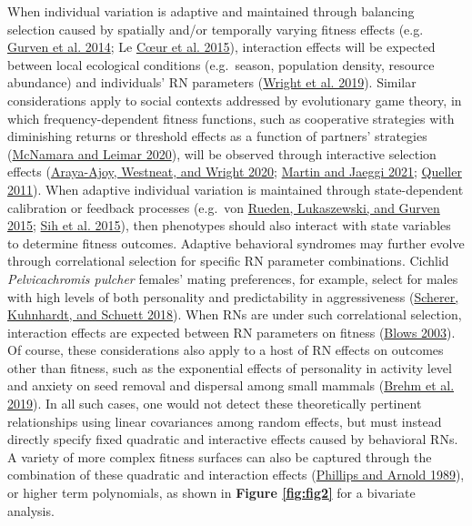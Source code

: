 \documentclass{article}
\begin{document}
When individual variation is adaptive and maintained through balancing
selection caused by spatially and/or temporally varying fitness effects
(e.g. \protect\hyperlink{ref-Gurven2014}{Gurven et al. 2014}; Le
\protect\hyperlink{ref-LC2015}{Cœur et al. 2015}), interaction effects
will be expected between local ecological conditions (e.g.~season,
population density, resource abundance) and individuals' RN parameters
(\protect\hyperlink{ref-Wright2019}{Wright et al. 2019}). Similar
considerations apply to social contexts addressed by evolutionary game
theory, in which frequency-dependent fitness functions, such as
cooperative strategies with diminishing returns or threshold effects as
a function of partners' strategies
(\protect\hyperlink{ref-McNamara2020}{McNamara and Leimar 2020}), will
be observed through interactive selection effects
(\protect\hyperlink{ref-Araya2020}{Araya-Ajoy, Westneat, and Wright
2020}; \protect\hyperlink{ref-Martin2021}{Martin and Jaeggi 2021};
\protect\hyperlink{ref-Queller2011}{Queller 2011}). When adaptive
individual variation is maintained through state-dependent calibration
or feedback processes (e.g.~von
\protect\hyperlink{ref-Rueden2015}{Rueden, Lukaszewski, and Gurven
2015}; \protect\hyperlink{ref-Sih2015}{Sih et al. 2015}), then
phenotypes should also interact with state variables to determine
fitness outcomes. Adaptive behavioral syndromes may further evolve
through correlational selection for specific RN parameter combinations.
Cichlid \emph{Pelvicachromis pulcher} females' mating preferences, for
example, select for males with high levels of both personality and
predictability in aggressiveness
(\protect\hyperlink{ref-Scherer2018}{Scherer, Kuhnhardt, and Schuett
2018}). When RNs are under such correlational selection, interaction
effects are expected between RN parameters on fitness
(\protect\hyperlink{ref-Blows2003}{Blows 2003}). Of course, these
considerations also apply to a host of RN effects on outcomes other than
fitness, such as the exponential effects of personality in activity
level and anxiety on seed removal and dispersal among small mammals
(\protect\hyperlink{ref-Brehm2019}{Brehm et al. 2019}). In all such
cases, one would not detect these theoretically pertinent relationships
using linear covariances among random effects, but must instead directly
specify fixed quadratic and interactive effects caused by behavioral
RNs. A variety of more complex fitness surfaces can also be captured
through the combination of these quadratic and interaction effects
(\protect\hyperlink{ref-Phillips1989}{Phillips and Arnold 1989}), or
higher term polynomials, as shown in \textbf{Figure \ref{fig:fig2}} for
a bivariate analysis.
\end{document}
